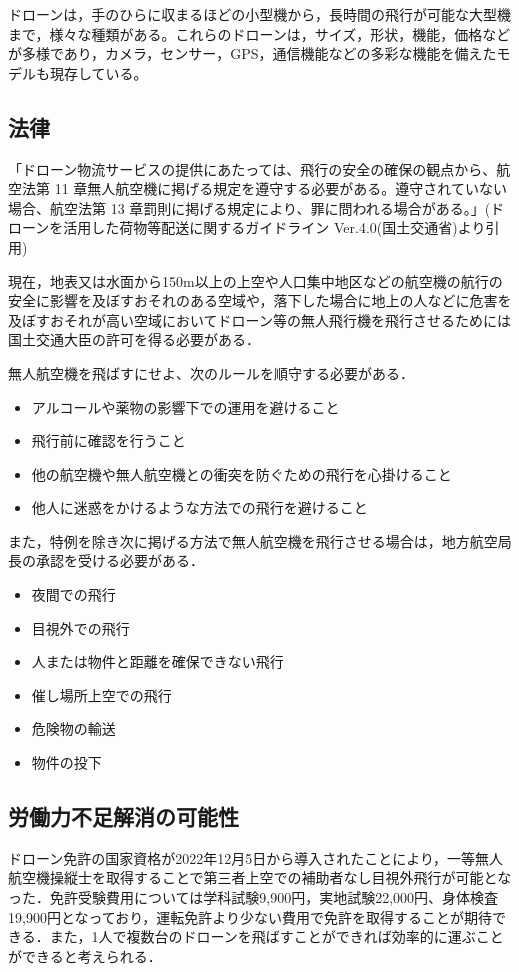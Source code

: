 \documentclass[a4paper, titlepage]{jsarticle}
\begin{document}
ドローンは，手のひらに収まるほどの小型機から，長時間の飛行が可能な大型機まで，様々な種類がある。これらのドローンは，サイズ，形状，機能，価格などが多様であり，カメラ，センサー，GPS，通信機能などの多彩な機能を備えたモデルも現存している。

\subsection{法律}
「ドローン物流サービスの提供にあたっては、飛行の安全の確保の観点から、航空法第 11 章無人航空機に掲げる規定を遵守する必要がある。遵守されていない場合、航空法第 13 章罰則に掲げる規定により、罪に問われる場合がある。」(ドローンを活用した荷物等配送に関するガイドライン Ver.4.0(国土交通省)\cite{delivery_guidelines_2023}より引用)

現在，地表又は水面から150m以上の上空や人口集中地区などの航空機の航行の安全に影響を及ぼすおそれのある空域や，落下した場合に地上の人などに危害を及ぼすおそれが高い空域においてドローン等の無人飛行機を飛行させるためには国土交通大臣の許可を得る必要がある．

無人航空機を飛ばすにせよ、次のルールを順守する必要がある．\cite{prohibited_guidelines}
\begin{itemize}
        \item アルコールや薬物の影響下での運用を避けること
        \item 飛行前に確認を行うこと
        \item 他の航空機や無人航空機との衝突を防ぐための飛行を心掛けること
        \item 他人に迷惑をかけるような方法での飛行を避けること
\end{itemize}
また，特例を除き次に掲げる方法で無人航空機を飛行させる場合は，地方航空局長の承認を受ける必要がある．
\begin{itemize}
        \item 夜間での飛行
        \item 目視外での飛行
        \item 人または物件と距離を確保できない飛行
        \item 催し場所上空での飛行
        \item 危険物の輸送
        \item 物件の投下
\end{itemize}

\subsection{労働力不足解消の可能性}
ドローン免許の国家資格が2022年12月5日から導入されたことにより，一等無人航空機操縦士を取得することで第三者上空での補助者なし目視外飛行が可能となった．免許受験費用については学科試験9,900円，実地試験22,000円、身体検査19,900円となっており，運転免許より少ない費用で免許を取得することが期待できる．また，1人で複数台のドローンを飛ばすことができれば効率的に運ぶことができると考えられる．
\end{document}
